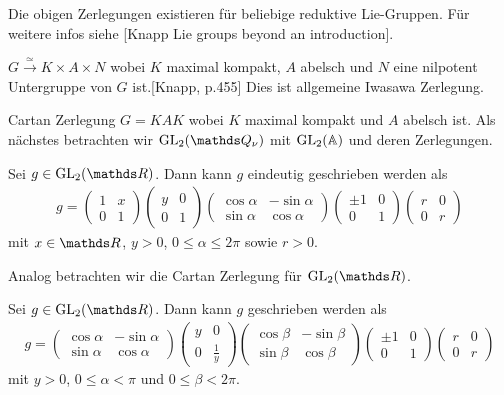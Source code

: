 Die obigen Zerlegungen existieren für beliebige reduktive Lie-Gruppen. Für weitere infos siehe [Knapp Lie groups beyond an introduction].

$G \overset{\simeq}\to K \times A \times N$ wobei $K$ maximal kompakt, $A$ abelsch  und $N$ eine nilpotent Untergruppe von $G$ ist.[Knapp, p.455]
Dies ist allgemeine Iwasawa Zerlegung.

Cartan Zerlegung $G=KAK$ wobei $K$ maximal kompakt und $A$ abelsch ist.
Als nächstes betrachten wir $\GL_2(\Q_\nu)$ mit $\operatorname{GL}_2(\mathbb{A})$ und deren Zerlegungen.

\begin{prop}
Sei $g\in \GL_2(\R)$.
Dann kann $g$ eindeutig geschrieben werden als
\begin{align*}
g=\begin{pmatrix}
1&x\\
0&1
\end{pmatrix}
\begin{pmatrix}
y&0\\
0&1
\end{pmatrix}
\begin{pmatrix}
\cos \alpha &-\sin \alpha\\
\sin \alpha &\cos \alpha
\end{pmatrix}
\begin{pmatrix}
\pm 1&0\\
0&1
\end{pmatrix}
\begin{pmatrix}
r&0\\
0&r
\end{pmatrix}
\end{align*}
mit $x \in \R$, $y>0$, $0\leq \alpha \leq 2\pi$ sowie $r>0$.
\end{prop}

Analog betrachten wir die Cartan Zerlegung für $\GL_2(\R)$.
\begin{prop}
Sei $g \in \GL_2(\R)$. Dann kann $g$ geschrieben werden als
\begin{align*}
g=\begin{pmatrix}
\cos \alpha &-\sin \alpha\\
\sin \alpha &\cos \alpha
\end{pmatrix}
\begin{pmatrix}
y&0\\
0&\frac{1}{y}
\end{pmatrix}
\begin{pmatrix}
\cos \beta &-\sin \beta\\
\sin \beta &\cos \beta
\end{pmatrix}
\begin{pmatrix}
\pm 1&0\\
0&1
\end{pmatrix}
\begin{pmatrix}
r&0\\
0&r
\end{pmatrix}
\end{align*}
mit $y>0$, $0\leq \alpha <\pi$ und $0\leq \beta <2\pi$.
\end{prop}